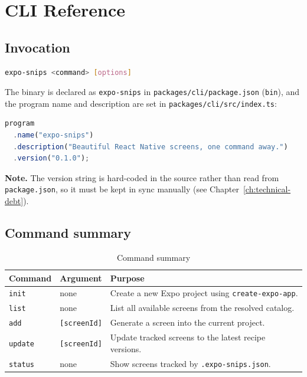 \chapter{CLI Reference}
\label{ch:cli-reference}

\section{Invocation}

\begin{lstlisting}[language=bash]
expo-snips <command> [options]
\end{lstlisting}

The binary is declared as \texttt{expo-snips} in
\texttt{packages/cli/package.json} (\texttt{bin}), and the program name and
description are set in \texttt{packages/cli/src/index.ts}:

\begin{lstlisting}[language=JavaScript]
program
  .name("expo-snips")
  .description("Beautiful React Native screens, one command away.")
  .version("0.1.0");
\end{lstlisting}

\textbf{Note.} The version string is hard-coded in the source rather than read from
\texttt{package.json}, so it must be kept in sync manually (see
Chapter~\ref{ch:technical-debt}).

\section{Command summary}

\begin{longtable}{p{2.1cm}p{3.1cm}p{8.6cm}}
\caption{Command summary}\\
\toprule
\textbf{Command} & \textbf{Argument} & \textbf{Purpose} \\
\midrule

\texttt{init} & none & Create a new Expo project using \texttt{create-expo-app}. \\
\texttt{list} & none & List all available screens from the resolved catalog. \\
\texttt{add} & \texttt{[screenId]} & Generate a screen into the current project. \\
\texttt{update} & \texttt{[screenId]} & Update tracked screens to the latest recipe versions. \\
\texttt{status} & none & Show screens tracked by \texttt{.expo-snips.json}. \\
\bottomrule
\end{longtable}


